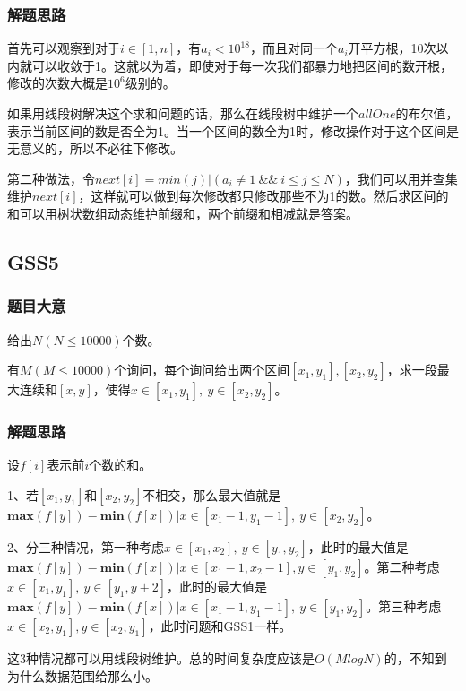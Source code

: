 	\subsubsection{解题思路}
	首先可以观察到对于$i\in [1,n]$，有$a_i<10^{18}$，而且对同一个$a_i$开平方根，10次以内就可以收敛于1。这就以为着，即使对于每一次我们都暴力地把区间的数开根，修改的次数大概是$10^6$级别的。\par
	如果用线段树解决这个求和问题的话，那么在线段树中维护一个$allOne$的布尔值，表示当前区间的数是否全为1。当一个区间的数全为1时，修改操作对于这个区间是无意义的，所以不必往下修改。\par
	第二种做法，令$next[i]=min(j)\Big |(a_i\neq 1\ \& \& \ i\leq j\leq N)$，我们可以用并查集维护$next[i]$，这样就可以做到每次修改都只修改那些不为1的数。然后求区间的和可以用树状数组动态维护前缀和，两个前缀和相减就是答案。\par



\subsection{GSS5}
	\subsubsection{题目大意} \par
	给出$N(N\leq 10000)$个数。 \par
	有$M(M\leq 10000)$个询问，每个询问给出两个区间$[x_1,y_1],[x_2,y_2]$，求一段最大连续和$[x,y]$，使得$x\in [x_1,y_1],\ y\in [x_2,y_2]$。 \par
	\subsubsection{解题思路} \par
	设$f[i]$表示前$i$个数的和。\par
	1、若$[x_1,y_1]$和$[x_2,y_2]$不相交，那么最大值就是$\mathbf{max}(f[y])-\mathbf{min}(f[x])\Big | x \in [x_1-1,y_1-1],\ y\in [x_2,y_2]$。\par
	2、分三种情况，第一种考虑$x\in[x_1,x_2],\ y\in[y_1,y_2]$，此时的最大值是$\mathbf{max}(f[y])-\mathbf{min}(f[x])\Big | x\in [x_1-1,x_2-1],y\in [y_1,y_2]$。第二种考虑$x\in[x_1,y_1],\ y\in[y_1,y+2]$，此时的最大值是$\mathbf{max}(f[y])-\mathbf{min}(f[x])\Big | x\in [x_1-1,y_1-1],\ y\in [y_1,y_2]$。第三种考虑$x\in[x_2,y_1],y\in[x_2,y_1]$，此时问题和GSS1一样。\par
	这3种情况都可以用线段树维护。总的时间复杂度应该是$O(MlogN)$的，不知到为什么数据范围给那么小。


